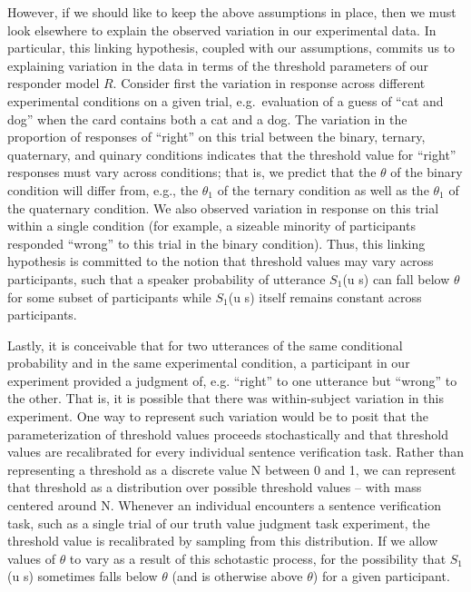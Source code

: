 \documentclass[man]{apa6}
\theoremstyle{definition}
\theoremstyle{definition}
\theoremstyle{definition}
\theoremstyle{remark}
\begin{document}
However, if we should like to keep the above assumptions in place, then
we must look elsewhere to explain the observed variation in our
experimental data. In particular, this linking hypothesis, coupled with
our assumptions, commits us to explaining variation in the data in terms
of the threshold parameters of our responder model \(R\). Consider first
the variation in response across different experimental conditions on a
given trial, e.g.~evaluation of a guess of \enquote{cat and dog} when
the card contains both a cat and a dog. The variation in the proportion
of responses of \enquote{right} on this trial between the binary,
ternary, quaternary, and quinary conditions indicates that the threshold
value for \enquote{right} responses must vary across conditions; that
is, we predict that the \(\theta\) of the binary condition will differ
from, e.g., the \(\theta_1\) of the ternary condition as well as the
\(\theta_1\) of the quaternary condition. We also observed variation in
response on this trial within a single condition (for example, a
sizeable minority of participants responded \enquote{wrong} to this
trial in the binary condition). Thus, this linking hypothesis is
committed to the notion that threshold values may vary across
participants, such that a speaker probability of utterance \(S_1\)(u
\textbar{} s) can fall below \(\theta\) for some subset of participants
while \(S_1\)(u \textbar{} s) itself remains constant across
participants.

Lastly, it is conceivable that for two utterances of the same
conditional probability and in the same experimental condition, a
participant in our experiment provided a judgment of, e.g.
\enquote{right} to one utterance but \enquote{wrong} to the other. That
is, it is possible that there was within-subject variation in this
experiment. One way to represent such variation would be to posit that
the parameterization of threshold values proceeds stochastically and
that threshold values are recalibrated for every individual sentence
verification task. Rather than representing a threshold as a discrete
value N between 0 and 1, we can represent that threshold as a
distribution over possible threshold values -- with mass centered around
N. Whenever an individual encounters a sentence verification task, such
as a single trial of our truth value judgment task experiment, the
threshold value is recalibrated by sampling from this distribution. If
we allow values of \(\theta\) to vary as a result of this schotastic
process, for the possibility that \(S_1\)(u \textbar{} s) sometimes
falls below \(\theta\) (and is otherwise above \(\theta\)) for a given
participant.
\end{document}
